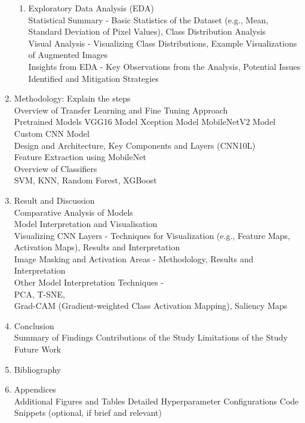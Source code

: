 \begin{enumerate}
\begin{enumerate}
            \item Exploratory Data Analysis (EDA) \\
            Statistical Summary - Basic Statistics of the Dataset (e.g., Mean, Standard Deviation of Pixel Values), Class Distribution Analysis\\
            Visual Analysis - Visualizing Class Distributions, Example Visualizations of Augmented Images\\
            Insights from EDA - Key Observations from the Analysis, Potential Issues Identified and Mitigation Strategies
        \end{enumerate}
    \item Methodology: Explain the steps\\
    Overview of Transfer Learning and Fine Tuning Approach\\
        Pretrained Models
        VGG16 Model
        Xception Model
        MobileNetV2 Model\\
    Custom CNN Model\\Design and Architecture, Key Components and Layers (CNN10L)\\ 
    Feature Extraction using MobileNet\\
    Overview of Classifiers\\
        SVM,
        KNN,
        Random Forest,
        XGBoost\\
    
    \item Result and Discussion\\Comparative Analysis of Models\\
        Model Interpretation and Visualisation\\
        Visualizing CNN Layers - Techniques for Visualization (e.g., Feature Maps, Activation Maps), Results and Interpretation\\
        Image Masking and Activation Areas - Methodology, Results and Interpretation\\
        Other Model Interpretation Techniques - \\
        PCA, T-SNE, \\
        Grad-CAM (Gradient-weighted Class Activation Mapping), Saliency Maps
    \item Conclusion\\
        Summary of Findings
        Contributions of the Study
        Limitations of the Study
        Future Work
    \item Bibliography
    \item Appendices\\
        Additional Figures and Tables
        Detailed Hyperparameter Configurations
        Code Snippets (optional, if brief and relevant)
\end{enumerate}


\newpage
